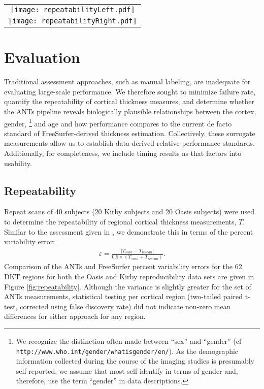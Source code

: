 \begin{figure*}[htb]
  \centering
  \begin{tabular}{c}
  \texttt{[image: repeatabilityLeft.pdf]} \\
  \texttt{[image: repeatabilityRight.pdf]}
  \end{tabular}
  \caption{Percent error variability for both ANTs and FreeSurfer pipelines 
           over the left and right hemispheres of both the Kirby and Oasis
           data subsets within the 62 regions defined by the
           Desikan-Killiany-Tourville atlas.  Both methods demonstrate good repeatability
           qualities.
           }
  \label{fig:repeatability}
\end{figure*}


\section{Evaluation}
Traditional assessment approaches, such as manual
labeling, are inadequate for evaluating large-scale performance.  
We therefore sought to minimize failure rate, quantify the repeatability of cortical
thickness measures, and
determine whether the ANTs pipeline reveals biologically plausible relationships
between the cortex, gender,%
\footnote{
We recognize the distinction often made between ``sex'' and ``gender'' 
(cf {\tt http://www.who.int/gender/whatisgender/en/}).
As the demographic information collected during the course of the imaging studies 
is presumably self-reported, we assume that most self-identify in terms of 
gender and, therefore, use the term ``gender'' in data
descriptions.
}
and age and how performance compares
to the current de facto standard of FreeSurfer-derived thickness estimation.
Collectively, these surrogate
measurements allow us to establish data-derived relative performance standards.
Additionally, for completeness, we include timing results as that factors into
usability.

\subsection{Repeatability}%

Repeat scans of 40 subjects (20 Kirby subjects and 20 Oasis subjects) were 
used to determine the repeatability of regional cortical thickness 
measurements, $T$.  Similar to the assessment given in \cite{jovicich2013}, we
demonstrate this in terms of the percent variability error:
\begin{align}
\varepsilon = \frac{|T_{scan} - T_{rescan}|}{0.5 \times (T_{scan} + T_{rescan})}.
\end{align}
Comparison of the ANTs and FreeSurfer percent variability errors for the 62 DKT 
regions for both the Oasis and Kirby reproducibility data sets
are given in Figure \ref{fig:repeatability}.  Although the variance is slightly greater 
for the set of ANTs measurements, statistical testing per cortical region 
(two-tailed paired t-test, corrected using false discovery rate) did not indicate 
non-zero mean differences for either approach for any region.

